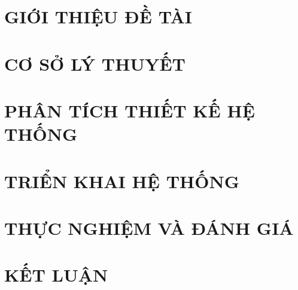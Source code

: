 \documentclass[a4paper,13pt,3p,twoside]{report}
\theoremstyle{definition}
\begin{document}
\glsaddall 
 \renewcommand*{\glossaryname}{Danh sách thuật ngữ}
\renewcommand*{\acronymname}{DANH MỤC THUẬT NGỮ VÀ TỪ VIẾT TẮT}
\renewcommand*{\entryname}{Thuật ngữ}
\renewcommand*{\descriptionname}{Ý nghĩa}
\printnoidxglossaries

\newpage


\newpage



\newpage
{}

\pagestyle{fancy}
\fancyhf{}
\fancyhead[RE, LO]{\leftmark}
\fancyfoot[RE, LO]{\thepage}

\chapter{GIỚI THIỆU ĐỀ TÀI}
\label{chapter:Introduction}


\newpage
\chapter{CƠ SỞ LÝ THUYẾT}
\label{chapter:Related_works}


\newpage
\chapter{PHÂN TÍCH THIẾT KẾ HỆ THỐNG}
\label{chapter:Design}


\newpage
\chapter{TRIỂN KHAI HỆ THỐNG}
\label{chapter:Implementation}


\newpage
\chapter{THỰC NGHIỆM VÀ ĐÁNH GIÁ}
\label{chapter:Experiment}


\newpage
\chapter*{KẾT LUẬN}

\end{document}
